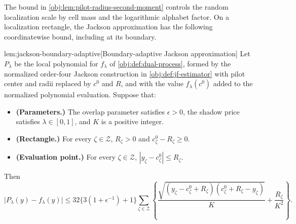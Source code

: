 \documentclass[11pt]{article}
\begin{document}
The bound in \cref{obj:lem:pilot-radius-second-moment} controls the random localization scale by cell mass and the logarithmic alphabet factor. On a localization rectangle, the Jackson approximation has the following coordinatewise bound, including at its boundary.

\begin{lemmav}{lem:jackson-boundary-adaptive}[Boundary-adaptive Jackson approximation]
Let \(P_\lambda\) be the local polynomial for \(f_\lambda\) of \cref{obj:def:dual-process}, formed by the normalized order-four Jackson construction in \cref{obj:def:jf-estimator} with pilot center and radii replaced by \(c^0\) and \(R\), and with the value \(f_\lambda(c^0)\) added to the normalized polynomial evaluation. Suppose that:
\begin{itemize}
\item \textbf{(Parameters.)} The overlap parameter satisfies \(\epsilon>0\), the shadow price satisfies \(\lambda\in[0,1]\), and \(K\) is a positive integer.
\item \textbf{(Rectangle.)} For every \(\zeta\in\mathcal Z\), \(R_\zeta>0\) and \(c^0_\zeta-R_\zeta\geq0\).
\item \textbf{(Evaluation point.)} For every \(\zeta\in\mathcal Z\), \(|y_\zeta-c^0_\zeta|\leq R_\zeta\).
\end{itemize}
Then
\[
\bigl|P_\lambda(y)-f_\lambda(y)\bigr|
\leq
32\bigl\{3(1+\epsilon^{-1})+1\bigr\}
\sum_{\zeta\in\mathcal Z}
\left\{
\frac{\sqrt{(y_\zeta-c^0_\zeta+R_\zeta)(c^0_\zeta+R_\zeta-y_\zeta)}}{K}
+\frac{R_\zeta}{K^2}
\right\}.
\]
\end{lemmav}
\end{document}
